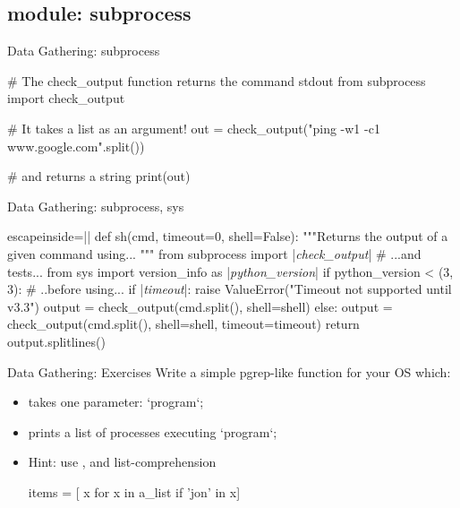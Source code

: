 \subsection{module: subprocess}
\begin{pyframe}{Data Gathering: subprocess}

%

\begin{pycode}
# The check_output function returns the command stdout
from subprocess import check_output

# It takes a list as an argument!
out = check_output("ping -w1 -c1 www.google.com".split())

# and returns a string
print(out)
\end{pycode}
\end{pyframe}

\begin{pyframe}{Data Gathering: subprocess, sys}
\begin{pycode*}{escapeinside=||}
def sh(cmd, timeout=0, shell=False):
    """Returns the output of a given command using... """
    from subprocess import |\emph{check\_output}| # ...and tests...
    from sys import version_info as |\emph{python\_version}|
    if python_version < (3, 3): # ..before using...
      if |\emph{timeout}|:
        raise ValueError("Timeout not supported until v3.3")
      output = check_output(cmd.split(), shell=shell)
    else:
      output = check_output(cmd.split(), shell=shell, timeout=timeout)
    return output.splitlines()
    
    
    
\end{pycode*}
\end{pyframe}

\begin{pyframe}{Data Gathering: Exercises}
Write a simple pgrep-like function for your OS which:
\begin{itemize}
\item takes one parameter: `program`;
\item prints a list of processes executing `program`;
\item Hint: use , and list-comprehension
\begin{pycode}
items = [ x for x in a_list if 'jon' in x]
\end{pycode}
\end{itemize}
\end{pyframe}


